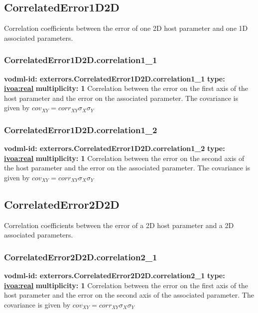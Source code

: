   \subsection{CorrelatedError1D2D}
  \label{sect:exterrors.CorrelatedError1D2D}
    Correlation coefficients between the error of one 2D host parameter and one 1D associated parameters.

    \subsubsection{CorrelatedError1D2D.correlation1\_1}
      \textbf{vodml-id: exterrors.CorrelatedError1D2D.correlation1\_1} \newline
      \textbf{type: \hyperref[sect:ivoa]{ivoa:real}} \newline
      \textbf{multiplicity: 1} \newline 
      Correlation between the error on the first axis of the host parameter and the error on the associated parameter. The covariance is given by $cov_{XY}=corr_{XY}\sigma_{X}\sigma_{Y}$

    \subsubsection{CorrelatedError1D2D.correlation1\_2}
      \textbf{vodml-id: exterrors.CorrelatedError1D2D.correlation1\_2} \newline
      \textbf{type: \hyperref[sect:ivoa]{ivoa:real}} \newline
      \textbf{multiplicity: 1} \newline 
      Correlation between the error on the second axis of the host parameter and the error on the associated parameter. The covariance is given by $cov_{XY}=corr_{XY}\sigma_{X}\sigma_{Y}$

  \subsection{CorrelatedError2D2D}
  \label{sect:exterrors.CorrelatedError2D2D}
    Correlation coefficients between the error of a 2D host parameter and a 2D associated parameters.

    \subsubsection{CorrelatedError2D2D.correlation2\_1}
      \textbf{vodml-id: exterrors.CorrelatedError2D2D.correlation2\_1} \newline
      \textbf{type: \hyperref[sect:ivoa]{ivoa:real}} \newline
      \textbf{multiplicity: 1} \newline 
      Correlation between the error on the first axis of the host parameter and the error on the second axis of the associated parameter. The covariance is given by $cov_{XY}=corr_{XY}\sigma_{X}\sigma_{Y}$

